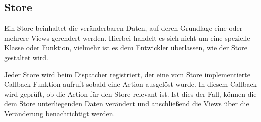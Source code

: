 \subsection{Store}
\label{ssec:gf_store}

Ein Store beinhaltet die veränderbaren Daten, auf deren Grundlage eine oder
mehrere Views gerendert werden.  Hierbei handelt es sich nicht um eine spezielle
Klasse oder Funktion, vielmehr ist es dem Entwickler überlassen, wie der Store
gestaltet wird.

Jeder Store wird beim Dispatcher registriert, der eine vom Store implementierte
Callback-Funktion aufruft sobald eine Action ausgelöst wurde.  In diesem
Callback wird geprüft, ob die Action für den Store relevant ist.  Ist dies der
Fall, können die dem Store unterliegenden Daten verändert und anschließend die
Views über die Veränderung benachrichtigt werden.
